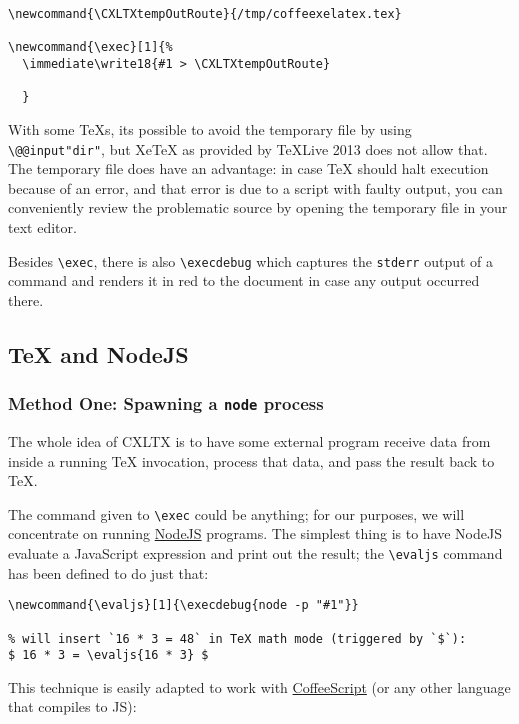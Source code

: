 \begin{verbatim}
\newcommand{\CXLTXtempOutRoute}{/tmp/coffeexelatex.tex}

\newcommand{\exec}[1]{%
  \immediate\write18{#1 > \CXLTXtempOutRoute}
  
  }
\end{verbatim}

With some TeXs, its possible to avoid the temporary file by using
\texttt{\textbackslash{}@@input\textbar{}"dir"}, but XeTeX as provided
by TeXLive 2013 does not allow that. The temporary file does have an
advantage: in case TeX should halt execution because of an error, and
that error is due to a script with faulty output, you can conveniently
review the problematic source by opening the temporary file in your text
editor.

Besides \texttt{\textbackslash{}exec}, there is also
\texttt{\textbackslash{}execdebug} which captures the \texttt{stderr}
output of a command and renders it in red to the document in case any
output occurred there.

\subsection{TeX and NodeJS}\label{tex-and-nodejs}

\subsubsection{Method One: Spawning a \texttt{node}
process}\label{method-one-spawning-a-node-process}

The whole idea of CXLTX is to have some external program receive data
from inside a running TeX invocation, process that data, and pass the
result back to TeX.

The command given to \texttt{\textbackslash{}exec} could be anything;
for our purposes, we will concentrate on running
\href{http://nodejs.org}{NodeJS} programs. The simplest thing is to have
NodeJS evaluate a JavaScript expression and print out the result; the
\texttt{\textbackslash{}evaljs} command has been defined to do just
that:

\begin{verbatim}
\newcommand{\evaljs}[1]{\execdebug{node -p "#1"}}

% will insert `16 * 3 = 48` in TeX math mode (triggered by `$`):
$ 16 * 3 = \evaljs{16 * 3} $
\end{verbatim}

This technique is easily adapted to work with
\href{http://coffeescript.org}{CoffeeScript} (or any other language that
compiles to JS):

